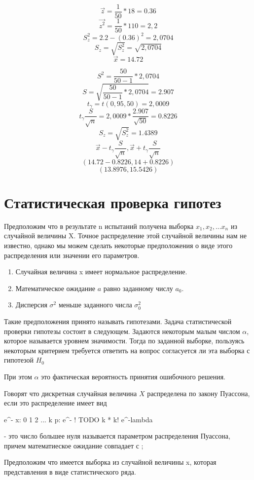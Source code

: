 \documentclass[a4paper]{article}
\begin{document}
$$ \vec{z} = \frac{1}{50} * 18 = 0.36$$
$$ \vec{z^2} = \frac{1}{50} * 110 = 2,2$$
$$ S_{z}^2 = 2.2 - (0.36)^2 = 2,0704 $$
$$ S_{z} = \sqrt{S_{z}^2} = \sqrt{2,0704} $$
$$ \vec{x} = 14.72$$

$$ S^2 = \frac{50}{50 - 1}*2,0704$$
$$ S = \sqrt{\frac{50}{50 - 1}*2,0704} = 2.907$$
$$ t_{\gamma} = t(0,95, 50) = 2,0009$$
$$ t_{\gamma} \frac{S}{\sqrt{n}} = 2,0009 * \frac{2.907}{\sqrt{50}} = 0.8226$$
$$ S_z = \sqrt{S_z^2} = 1.4389 $$
$$ \vec{x} - t_{\gamma}\frac{S}{\sqrt{n}}, \vec{x} + t_{\gamma}\frac{S}{\sqrt{n}}$$
$$ (14.72 - 0.8226, 14 + 0.8226)$$
$$ (13.8976, 15.5426)$$

\section{Статистическая проверка гипотез}

Предположим что в результате n испытаний получена выборка $x_1, x_2, ... x_n$ из случайной величины X. Точное распределение этой случайной величины нам не известно, однако мы можем сделать некоторые предположения о виде этого распределения или значении его параметров. 
\begin{enumerate}
    \item Случайная величина x имеет нормальное распределение.
    \item Математическое ожидание $a$ равно заданному числу $a_0$.
    \item Дисперсия $\sigma^2$ меньше заданного числа $\sigma_0^2$
\end{enumerate}

Такие предположения принято называть гипотезами. Задача статистической проверки гипотезы состоит в следующем.
Задаются некоторым малым числом $\alpha$, которое называется уровнем значимости. Тогда по заданной выборке, пользуясь некоторым критерием требуется ответить на вопрос согласуется ли эта выборка с гипотезой $H_0$

При этом $\alpha$ это фактическая вероятность принятия ошибочного решения.


Говорят что дискретная случайная величина $X$ распределена по закону Пуассона, если это распределение имеет вид

e^{-\lambda}
x: 0 1 2 ... k
p: e^{-\lambda} 
! TODO
k * \lambda k! e^{-lambda}

\lambda - это число большее нуля называется параметром распределения Пуассона, причем математиеское ожидание совпадает с \lambda;

Предположим что имеется выборка из случайной величины x, которая представления в виде статистического ряда.
\end{document}
